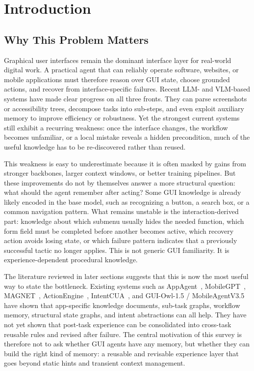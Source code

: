 \documentclass{article}
\begin{document}
\section{Introduction}\label{2-introduction}

\subsection{Why This Problem Matters}\label{21-why-this-problem-matters}

Graphical user interfaces remain the dominant interface layer for
real-world digital work. A practical agent that can reliably operate
software, websites, or mobile applications must therefore reason over
GUI state, choose grounded actions, and recover from interface-specific
failures. Recent LLM- and VLM-based systems have made clear progress on
all three fronts. They can parse screenshots or accessibility trees,
decompose tasks into sub-steps, and even exploit auxiliary memory to
improve efficiency or robustness. Yet the strongest current systems
still exhibit a recurring weakness: once the interface changes, the
workflow becomes unfamiliar, or a local mistake reveals a hidden
precondition, much of the useful knowledge has to be re-discovered
rather than reused.

This weakness is easy to underestimate because it is often masked by
gains from stronger backbones, larger context windows, or better
training pipelines. But these improvements do not by themselves answer a
more structural question: what should the agent remember after acting?
Some GUI knowledge is already likely encoded in the base model, such as
recognizing a button, a search box, or a common navigation pattern. What
remains unstable is the interaction-derived part: knowledge about which
submenu usually hides the needed function, which form field must be
completed before another becomes active, which recovery action avoids
losing state, or which failure pattern indicates that a previously
successful tactic no longer applies. This is not generic GUI
familiarity. It is experience-dependent procedural knowledge.

The literature reviewed in later sections suggests that this is now the
most useful way to state the bottleneck. Existing systems such as
AppAgent~\parencite{zhang2023appagentmultimodalagentssmartphone},
MobileGPT~\parencite{lee2024exploreselectderiverecall},
MAGNET~\parencite{sun2026magnetadaptiveguiagents},
ActionEngine~\parencite{zhong2026actionenginereactiveprogrammaticgui},
IntentCUA~\parencite{lee2026intentcualearningintentlevelrepresentations}, and GUI-Owl-1.5 /
MobileAgentV3.5~\parencite{xu2026mobileagentv35multiplatformfundamentalgui} have shown that
app-specific knowledge documents, sub-task graphs, workflow memory,
structural state graphs, and intent abstractions can all help. They
have not yet shown that post-task experience can be consolidated into
cross-task reusable rules and revised after failure. The central
motivation of this survey is therefore not to ask whether GUI agents
have any memory, but whether they can build the right kind of memory: a
reusable and revisable experience layer that goes beyond static hints
and transient context management.
\end{document}
